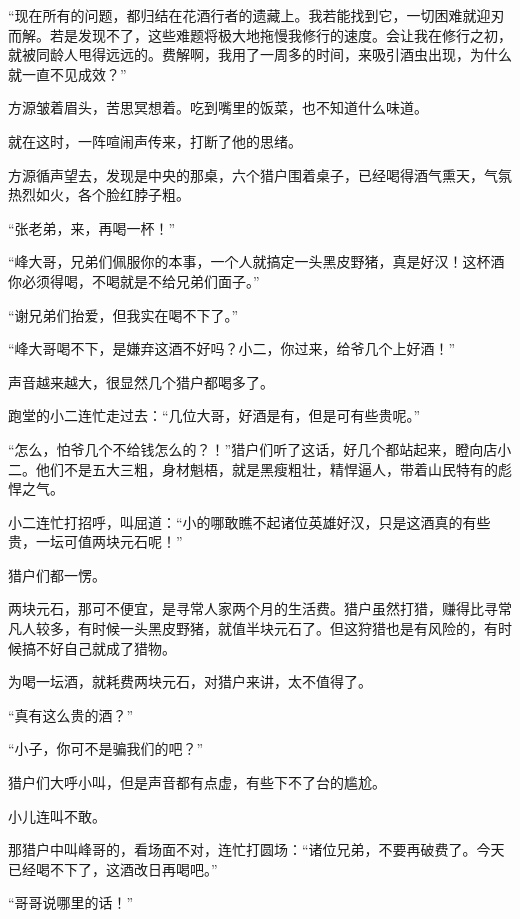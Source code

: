 
\begin{this_body}

“现在所有的问题，都归结在花酒行者的遗藏上。我若能找到它，一切困难就迎刃而解。若是发现不了，这些难题将极大地拖慢我修行的速度。会让我在修行之初，就被同龄人甩得远远的。费解啊，我用了一周多的时间，来吸引酒虫出现，为什么就一直不见成效？”

方源皱着眉头，苦思冥想着。吃到嘴里的饭菜，也不知道什么味道。

就在这时，一阵喧闹声传来，打断了他的思绪。

方源循声望去，发现是中央的那桌，六个猎户围着桌子，已经喝得酒气熏天，气氛热烈如火，各个脸红脖子粗。

“张老弟，来，再喝一杯！”

“峰大哥，兄弟们佩服你的本事，一个人就搞定一头黑皮野猪，真是好汉！这杯酒你必须得喝，不喝就是不给兄弟们面子。”

“谢兄弟们抬爱，但我实在喝不下了。”

“峰大哥喝不下，是嫌弃这酒不好吗？小二，你过来，给爷几个上好酒！”

声音越来越大，很显然几个猎户都喝多了。

跑堂的小二连忙走过去：“几位大哥，好酒是有，但是可有些贵呢。”

“怎么，怕爷几个不给钱怎么的？！”猎户们听了这话，好几个都站起来，瞪向店小二。他们不是五大三粗，身材魁梧，就是黑瘦粗壮，精悍逼人，带着山民特有的彪悍之气。

小二连忙打招呼，叫屈道：“小的哪敢瞧不起诸位英雄好汉，只是这酒真的有些贵，一坛可值两块元石呢！”

猎户们都一愣。

两块元石，那可不便宜，是寻常人家两个月的生活费。猎户虽然打猎，赚得比寻常凡人较多，有时候一头黑皮野猪，就值半块元石了。但这狩猎也是有风险的，有时候搞不好自己就成了猎物。

为喝一坛酒，就耗费两块元石，对猎户来讲，太不值得了。

“真有这么贵的酒？”

“小子，你可不是骗我们的吧？”

猎户们大呼小叫，但是声音都有点虚，有些下不了台的尴尬。

小儿连叫不敢。

那猎户中叫峰哥的，看场面不对，连忙打圆场：“诸位兄弟，不要再破费了。今天已经喝不下了，这酒改日再喝吧。”

“哥哥说哪里的话！”


\end{this_body}
